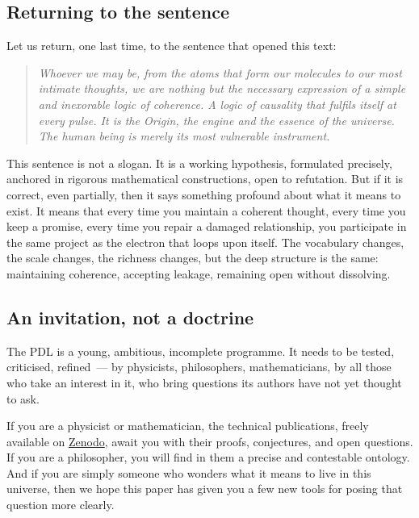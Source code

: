 \documentclass[12pt, a4paper, openright]{book}
\begin{document}
\subsection*{Returning to the sentence}

Let us return, one last time, to the sentence that opened this text:

\begin{quote}
\itshape Whoever we may be, from the atoms that form our molecules to our most intimate thoughts, we are nothing but the necessary expression of a simple and inexorable logic of coherence. A logic of causality that fulfils itself at every pulse. It is the Origin, the engine and the essence of the universe. The human being is merely its most vulnerable instrument.
\end{quote}

This sentence is not a slogan. It is a working hypothesis, formulated precisely, anchored in rigorous mathematical constructions, open to refutation. But if it is correct, even partially, then it says something profound about what it means to exist. It means that every time you maintain a coherent thought, every time you keep a promise, every time you repair a damaged relationship, you participate in the same project as the electron that loops upon itself. The vocabulary changes, the scale changes, the richness changes, but the deep structure is the same: maintaining coherence, accepting leakage, remaining open without dissolving.

\subsection*{An invitation, not a doctrine}

The PDL is a young, ambitious, incomplete programme. It needs to be tested, criticised, refined~--- by physicists, philosophers, mathematicians, by all those who take an interest in it, who bring questions its authors have not yet thought to ask.

\medskip

If you are a physicist or mathematician, the technical publications, freely available on \href{https://zenodo.org}{Zenodo}, await you with their proofs, conjectures, and open questions. If you are a philosopher, you will find in them a precise and contestable ontology. And if you are simply someone who wonders what it means to live in this universe, then we hope this paper has given you a few new tools for posing that question more clearly.
\end{document}
